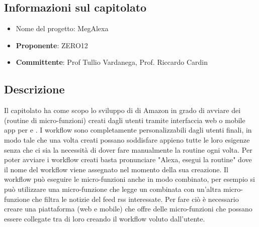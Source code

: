 \subsection{Informazioni sul capitolato}
    \begin{itemize}
        \item Nome del progetto: MegAlexa
        \item \textbf{Proponente}: ZERO12
        \item \textbf{Committente}: Prof Tullio Vardanega, Prof. Riccardo Cardin
    \end{itemize}
\subsection{Descrizione}
Il capitolato ha come scopo lo sviluppo di  di Amazon in grado di avviare dei  (routine di micro-funzioni) creati dagli utenti tramite interfaccia web o
mobile app per  e . I workflow sono completamente personalizzabili dagli utenti finali, in modo tale che una volta creati possano soddisfare appieno tutte
le loro esigenze senza che ci sia la necessità di dover fare manualmente la routine ogni volta. Per poter avviare i workflow creati
basta pronunciare "Alexa, esegui la routine" dove il nome del workflow viene assegnato nel momento della sua creazione. Il workflow può eseguire le micro-funzioni
anche in modo combinato, per esempio si può utilizzare una micro-funzione che legge un  combinata con un'altra micro-funzione che filtra le notizie del feed rss interessate.
Per fare ciò è necessario creare una piattaforma (web e mobile) che offre delle micro-funzioni che possano essere collegate tra di loro creando il workflow voluto dall'utente.



